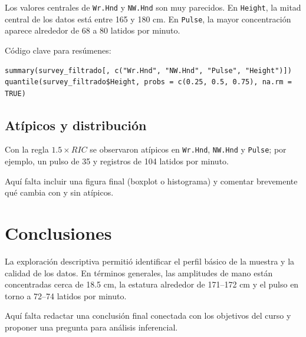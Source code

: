 \documentclass[11pt]{article}
\begin{document}
Los valores centrales de \texttt{Wr.Hnd} y \texttt{NW.Hnd} son muy parecidos. En \texttt{Height}, la mitad central de los datos está entre 165 y 180 cm. En \texttt{Pulse}, la mayor concentración aparece alrededor de 68 a 80 latidos por minuto.

Código clave para resúmenes:
\begin{verbatim}
summary(survey_filtrado[, c("Wr.Hnd", "NW.Hnd", "Pulse", "Height")])
quantile(survey_filtrado$Height, probs = c(0.25, 0.5, 0.75), na.rm = TRUE)
\end{verbatim}

\subsection{Atípicos y distribución}
Con la regla $1.5\times RIC$ se observaron atípicos en \texttt{Wr.Hnd}, \texttt{NW.Hnd} y \texttt{Pulse}; por ejemplo, un pulso de 35 y registros de 104 latidos por minuto.

Aquí falta incluir una figura final (boxplot o histograma) y comentar brevemente qué cambia con y sin atípicos.

\section{Conclusiones}
La exploración descriptiva permitió identificar el perfil básico de la muestra y la calidad de los datos. En términos generales, las amplitudes de mano están concentradas cerca de 18.5 cm, la estatura alrededor de 171--172 cm y el pulso en torno a 72--74 latidos por minuto.

Aquí falta redactar una conclusión final conectada con los objetivos del curso y proponer una pregunta para análisis inferencial.
\end{document}
